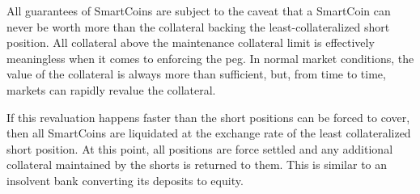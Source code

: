 \label{sec:blackswan}

All guarantees of SmartCoins are subject to the caveat that a SmartCoin can
never be worth more than the collateral backing the least-collateralized short
position. All collateral above the maintenance collateral limit is effectively
meaningless when it comes to enforcing the peg. In normal market conditions,
the value of the collateral is always more than sufficient, but, from time to
time, markets can rapidly revalue the collateral.


If this revaluation happens faster than the short positions can be forced to
cover, then all SmartCoins are liquidated at the exchange rate of the least
collateralized short position.
%
At this point, all positions are force settled and any additional collateral
maintained by the shorts is returned to them. This is similar to an insolvent
bank converting its deposits to equity.
